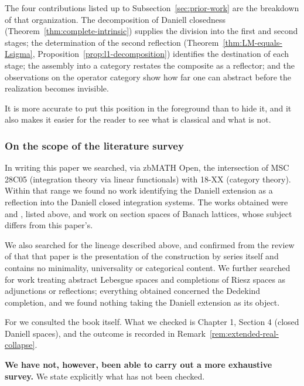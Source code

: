 \noindent
The four contributions listed up to
Subsection~\ref{sec:prior-work} are the breakdown of that organization.
The decomposition of Daniell closedness
(Theorem~\ref{thm:complete-intrinsic}) supplies the division into the first and
second stages; the determination of the second reflection
(Theorem~\ref{thm:LM-equals-Lsigma},
Proposition~\ref{prop:l1-decomposition}) identifies the destination of each
stage; the assembly into a category restates the composite as a reflector; and
the observations on the operator category show how far one can abstract before
the realization becomes invisible.

It is more accurate to put this position in the foreground than to hide it, and
it also makes it easier for the reader to see what is classical and what is not.

\subsubsection{On the scope of the literature survey}

In writing this paper we searched, via zbMATH Open, the intersection of
MSC 28C05 (integration theory via linear functionals) with 18-XX (category
theory).
Within that range we found no work identifying the Daniell extension as a
reflection into the Daniell closed integration systems.
The works obtained were \cite{Hartig} and \cite{BorgerHabil}, listed above, and
work on section spaces of Banach lattices, whose subject differs from this
paper's.

We also searched for the lineage described above, and confirmed from the review
of \cite{M1989} that that paper is the presentation of the construction by
series itself and contains no minimality, universality or categorical content.
We further searched for work treating abstract Lebesgue spaces and completions of
Riesz spaces as adjunctions or reflections; everything obtained concerned the
Dedekind completion, and we found nothing taking the Daniell extension as its
object.

For \cite{CWS} we consulted the book itself. What we checked is
Chapter 1, Section 4 (closed Daniell spaces), and the outcome is recorded in
Remark~\ref{rem:extended-real-collapse}.

\textbf{We have not, however, been able to carry out a more exhaustive survey.}
We state explicitly what has not been checked.

